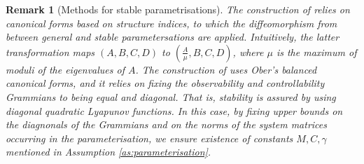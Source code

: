 \documentclass{article}
\newtheorem{remark}[theorem]{Remark}
\begin{document}
\begin{remark}[Methods for stable parametrisations]
\label{rem:parameter:methods}
 The construction of \cite[Section 3.2.3]{RalfPeeters} relies on canonical forms based on structure indices, to which the diffeomorphism from \cite{HanzonStable1}
 between general and stable parametersations are applied. Intuitively, the latter transformation maps $(A,B,C,D)$ to $(\frac{A}{\mu},B,C,D)$, where $\mu$ is the maximum of moduli of the eigenvalues of $A$. 
 The construction of \cite[Section  4.6]{Ribarits1} uses Ober's balanced canonical forms, and it relies on fixing the observability and controllability Grammians to being equal and diagonal. 
 That is, stability is assured by using diagonal quadratic Lyapunov functions. 
 In this case, by fixing upper bounds on the diagnonals of the Grammians and on the norms of the system matrices occurring in the parameterisation, we ensure existence of constants $M,C,\gamma$ mentioned in Assumption \ref{as:parameterisation}. 
\end{remark}
\end{document}
